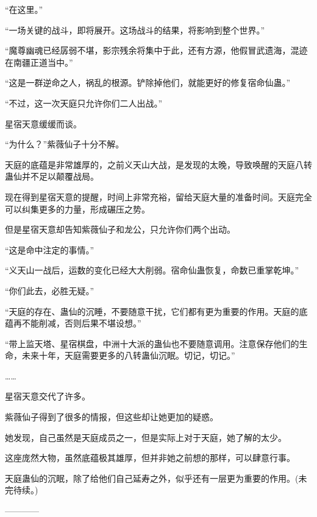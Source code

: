 \begin{this_body}
“在这里。”

“一场关键的战斗，即将展开。这场战斗的结果，将影响到整个世界。”

“魔尊幽魂已经孱弱不堪，影宗残余将集中于此，还有方源，他假冒武遗海，混迹在南疆正道当中。”

“这是一群逆命之人，祸乱的根源。铲除掉他们，就能更好的修复宿命仙蛊。”

“不过，这一次天庭只允许你们二人出战。”

星宿天意缓缓而谈。

“为什么？”紫薇仙子十分不解。

天庭的底蕴是非常雄厚的，之前义天山大战，是发现的太晚，导致唤醒的天庭八转蛊仙并不足以颠覆战局。

现在得到星宿天意的提醒，时间上非常充裕，留给天庭大量的准备时间。天庭完全可以纠集更多的力量，形成碾压之势。

但是星宿天意却告知紫薇仙子和龙公，只允许你们两个出动。

“这是命中注定的事情。”

“义天山一战后，运数的变化已经大大削弱。宿命仙蛊恢复，命数已重掌乾坤。”

“你们此去，必胜无疑。”

“天庭的存在、蛊仙的沉睡，不要随意干扰，它们都有更为重要的作用。天庭的底蕴再不能削减，否则后果不堪设想。”

“带上监天塔、星宿棋盘，中洲十大派的蛊仙也不要随意调用。注意保存他们的生命，未来十年，天庭需要更多的八转蛊仙沉眠。切记，切记。”

……

星宿天意交代了许多。

紫薇仙子得到了很多的情报，但这些却让她更加的疑惑。

她发现，自己虽然是天庭成员之一，但是实际上对于天庭，她了解的太少。

这座庞然大物，虽然底蕴极其雄厚，但并非她之前想的那样，可以肆意行事。

天庭蛊仙的沉眠，除了给他们自己延寿之外，似乎还有一层更为重要的作用。(未完待续。)

------------

\end{this_body}


